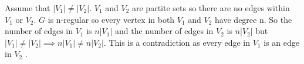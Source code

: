 Assume that $|V_1| \neq |V_2|$. 
$V_1$ and $V_2$ are partite sets so there are no edges within $V_1$ or $V_2$.
$G$ is n-regular so every vertex in both $V_1$ and $V_2$ have degree n. So the number of edges in $V_1$ is $n|V_1|$ and the number of edges in $V_2$ is $n|V_2|$ but $|V_1| \neq |V_2| \implies n|V_1| \neq n|V_2|$. This is a contradiction as every edge in $V_1$ is an edge in $V_2$ . 
